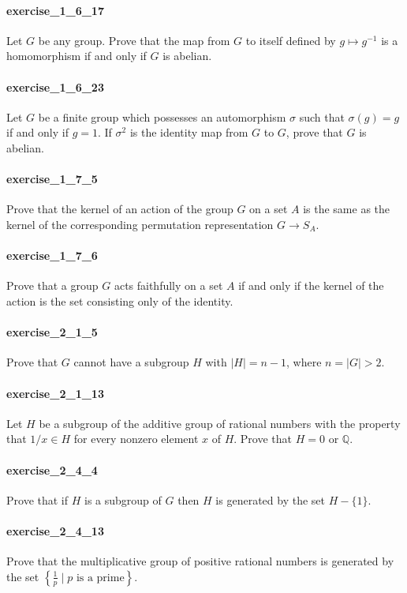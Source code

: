 \documentclass{article}
\begin{document}
\paragraph{exercise\_1\_6\_17} Let $G$ be any group. Prove that the map from $G$ to itself defined by $g \mapsto g^{-1}$ is a homomorphism if and only if $G$ is abelian.

\paragraph{exercise\_1\_6\_23} Let $G$ be a finite group which possesses an automorphism $\sigma$ such that $\sigma(g)=g$ if and only if $g=1$. If $\sigma^{2}$ is the identity map from $G$ to $G$, prove that $G$ is abelian.

\paragraph{exercise\_1\_7\_5} Prove that the kernel of an action of the group $G$ on a set $A$ is the same as the kernel of the corresponding permutation representation $G\to S_A$.

\paragraph{exercise\_1\_7\_6} Prove that a group $G$ acts faithfully on a set $A$ if and only if the kernel of the action is the set consisting only of the identity.

\paragraph{exercise\_2\_1\_5} Prove that $G$ cannot have a subgroup $H$ with $|H|=n-1$, where $n=|G|>2$.

\paragraph{exercise\_2\_1\_13} Let $H$ be a subgroup of the additive group of rational numbers with the property that $1 / x \in H$ for every nonzero element $x$ of $H$. Prove that $H=0$ or $\mathbb{Q}$.

\paragraph{exercise\_2\_4\_4} Prove that if $H$ is a subgroup of $G$ then $H$ is generated by the set $H-\{1\}$.

\paragraph{exercise\_2\_4\_13} Prove that the multiplicative group of positive rational numbers is generated by the set $\left\{\frac{1}{p} \mid \text{$p$ is a prime} \right\}$.
\end{document}
